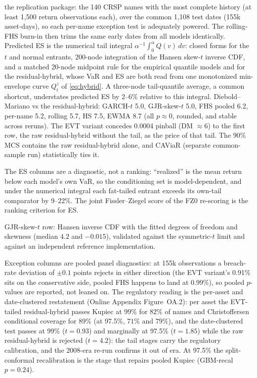 \documentclass[11pt]{article}
\theoremstyle{remark}
\begin{document}
\begin{table}[t]
\begin{threeparttable}
\begin{tablenotes}
the replication package: the 140 CRSP names with the most
complete history (at least 1{,}500 return observations each), over the
common 1{,}108 test dates (155k asset-days), so each per-name exception
test is adequately powered. The rolling-FHS burn-in then trims the same
early dates from all models identically.
Predicted ES is the numerical tail integral
$\alpha^{-1}\!\int_0^\alpha Q(v)\,dv$: closed forms for the $t$ and
normal entrants, 200-node integration of the Hansen skew-$t$ inverse
CDF, and a matched 20-node midpoint rule for the empirical quantile
models and for the residual-hybrid, whose VaR and ES are both read from
one monotonized min-envelope curve $Q^{z}_t$ of \eqref{eq:hybrid}. A three-node tail-quantile average, a common shortcut,
understates predicted ES by 2--6\% relative to this integral.
Diebold--Mariano vs the residual-hybrid: GARCH-$t$ 5.0, GJR-skew-$t$ 5.0,
FHS pooled 6.2, per-name 5.2, rolling 5.7, HS 7.5, EWMA 8.7 (all
$p\approx0$, rounded, and stable across reruns). The EVT variant
concedes 0.0004 pinball (DM ${\approx}6$) to the first row, the raw
residual-hybrid without the tail, as the price of that tail. The 90\% MCS contains the
raw residual-hybrid alone, and CAViaR (separate common-sample run)
statistically ties it.
\item The ES columns are a diagnostic, not a ranking:
``realized'' is the mean return below each model's own VaR, so
the conditioning set is model-dependent, and under the numerical integral
each fat-tailed entrant exceeds its own-tail comparator by 9--22\%.
The joint Fissler--Ziegel score of the FZ0 re-scoring is the ranking
criterion for ES.
\item GJR-skew-$t$ row: Hansen inverse CDF with the fitted
degrees of freedom and skewness (median $4.2$ and $-0.015$), validated against the
symmetric-$t$ limit and against an independent reference implementation.
\item Exception columns are pooled panel diagnostics: at 155k
observations a breach-rate deviation of $\pm0.1$ points rejects in
either direction (the EVT variant's 0.91\% sits on the conservative
side, pooled FHS happens to land at 0.99\%), so pooled $p$-values are
reported, not leaned on. The regulatory reading is the per-asset and
date-clustered restatement (Online Appendix Figure~OA.2): per asset the
EVT-tailed residual-hybrid passes Kupiec at 99\% for $82\%$ of names and
Christoffersen conditional coverage for $89\%$ (at 97.5\%, $71\%$ and $79\%$), and the date-clustered test passes at 99\% ($t=0.93$) and marginally at 97.5\% ($t=1.85$) while the raw residual-hybrid is rejected ($t=4.2$): the tail stages carry the regulatory
calibration, and the 2008-era re-run confirms it out of era.
At 97.5\% the split-conformal recalibration is the stage that repairs
pooled Kupiec (GBM-recal $p=0.24$).
\end{tablenotes}
\end{threeparttable}
\end{table}
\end{document}
